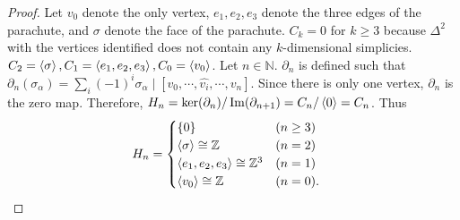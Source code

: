\documentclass[12pt, psamsfonts]{amsart}
\theoremstyle{definition}
\theoremstyle{remark}
\numberwithin{equation}{section}
\begin{document}
\begin{proof}
  Let $v_0$ denote the only vertex, $e_1, e_2, e_3$ denote the three edges of the parachute, and $\sigma$ denote the face of the parachute.
  $C_k = 0$ for $k \geq 3$ because $\Delta^2$ with the vertices identified does not contain any $k$-dimensional simplicies.
  $C_2 = \ev{ \sigma}, C_1 = \ev{ e_1, e_2, e_3 }, C_0 = \ev{ v_0 }$.
  Let $n \in \mathbb{N}$.
  $\partial_n$ is defined such that $\partial_n(\sigma_{\alpha}) = \sum_{i}(-1)^i\sigma_{\alpha}\mid[v_0, \cdots, \hat{v_i}, \cdots, v_n]$.
  Since there is only one vertex, $\partial_n$ is the zero map.
  Therefore, $H_n = \ker(\partial_n) / \Im(\partial_{n + 1}) = C_n / \ev{ 0 } = C_n$.
  Thus
  \begin{align*}
    H_n &= \begin{cases}
      \{ 0 \} & (n \geq 3) \\
      \ev{ \sigma } \cong \mathbb{Z} & (n = 2) \\
      \ev{ e_1, e_2, e_3 } \cong \mathbb{Z}^3 & (n = 1) \\
      \ev{ v_0 } \cong \mathbb{Z} & (n = 0).
    \end{cases}
  \end{align*}
\end{proof}
\end{document}
